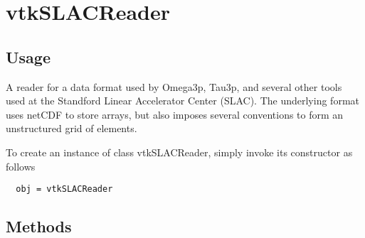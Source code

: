 \section{vtkSLACReader}

\subsection{Usage}


 A reader for a data format used by Omega3p, Tau3p, and several other tools
 used at the Standford Linear Accelerator Center (SLAC).  The underlying
 format uses netCDF to store arrays, but also imposes several conventions
 to form an unstructured grid of elements.


To create an instance of class vtkSLACReader, simply
invoke its constructor as follows
\begin{verbatim}
  obj = vtkSLACReader
\end{verbatim}
\subsection{Methods}

